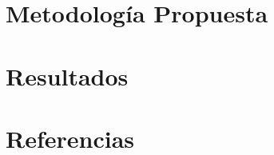 \documentclass[a4paper,11pt]{article}
\begin{document}
\section{Metodología Propuesta}
\section{Resultados}
\section{Referencias}
\end{document}

